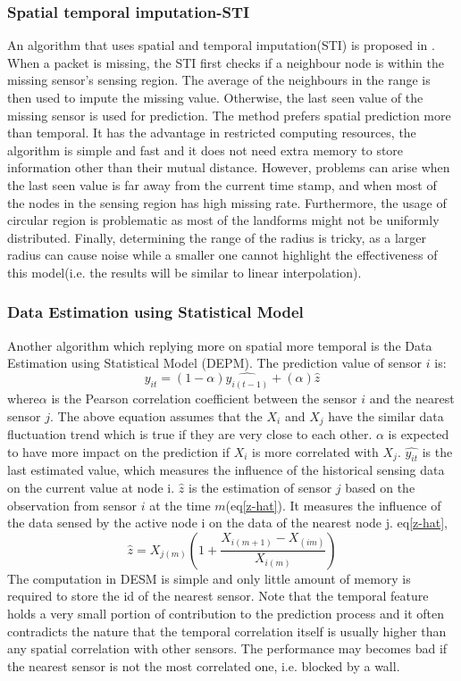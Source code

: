 \subsubsection{Spatial temporal imputation-STI}
An algorithm that uses spatial and temporal imputation(STI) is proposed in \cite{Li:STI}. 
When a packet is missing, the STI first checks if a neighbour node is within the missing sensor's sensing region. 
The average of the neighbours in the range is then used to impute the missing value. 
Otherwise, the last seen value of the missing sensor is used for prediction. 
The method prefers spatial prediction more than temporal. 
It has the advantage in restricted computing resources, the algorithm is simple and fast and it does not need extra memory to store information other than their mutual distance.
However, problems can arise when the last seen value is far away from the current time stamp, and when most of the nodes in the sensing region has high missing rate. 
Furthermore, the usage of circular region is problematic as most of the landforms might not be uniformly distributed. Finally, determining the range of the radius is tricky, as a larger radius can cause noise while a smaller one cannot highlight the effectiveness of this model(i.e. the results will be similar to linear interpolation).
\subsubsection{Data Estimation using Statistical Model}
Another algorithm which replying more on spatial more temporal is the Data Estimation using Statistical Model (DEPM)\cite{LI:DESM}.  
The prediction value of sensor $i$ is:
\begin{equation}
\hat{y_{it}} = (1-\alpha)\hat{y_{i(t-1)}} + (\alpha)\hat{z}
\end{equation}
where$\alpha$ is the Pearson correlation coefficient between the sensor $i$ and the nearest sensor $j$.
The above equation assumes that the $X_i$ and $X_j$ have the similar data fluctuation trend which is true if they are very close to each other. 
$\alpha$ is expected to have more impact on the prediction if $X_i$ is more correlated with $X_j$. 
$\hat{y_{it}}$ is the last estimated value, which measures the influence of the historical sensing data on the current value at node i. 
$\hat{z}$ is the estimation of sensor $j$ based on the observation from sensor $i$ at the time $m$(eq\ref{z-hat}). It measures the influence of the data sensed by the active node i on the data of the nearest node j. eq\ref{z-hat},  
\begin{equation}
\hat{z} = X_{j(m)}(1+\frac{X_{i(m+1)}-X_{(im)}}{X_{i(m)}})
\label{z-hat}
\end{equation}
The computation in DESM is simple and only little amount of memory is required to store the id of the nearest sensor. 
Note that the temporal feature holds a very small portion of contribution to the prediction process and it often contradicts the nature that the temporal correlation itself is usually higher than any spatial correlation with other sensors. The performance may becomes bad if the nearest sensor is not the most correlated one, i.e. blocked by a wall.
